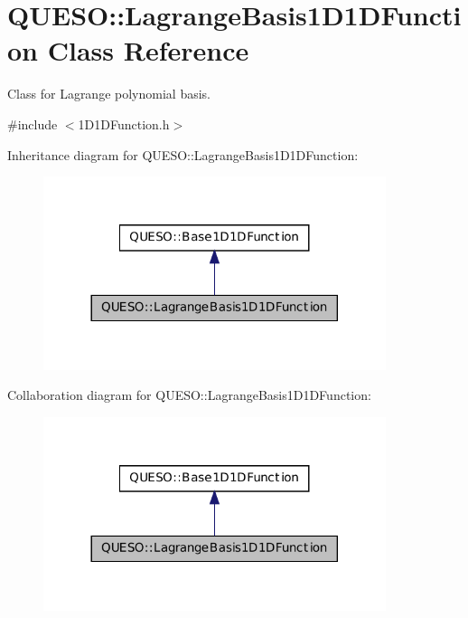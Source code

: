 \hypertarget{class_q_u_e_s_o_1_1_lagrange_basis1_d1_d_function}{\section{Q\-U\-E\-S\-O\-:\-:Lagrange\-Basis1\-D1\-D\-Function Class Reference}
\label{class_q_u_e_s_o_1_1_lagrange_basis1_d1_d_function}
}


Class for Lagrange polynomial basis.  




{\ttfamily \#include $<$1\-D1\-D\-Function.\-h$>$}



Inheritance diagram for Q\-U\-E\-S\-O\-:\-:Lagrange\-Basis1\-D1\-D\-Function\-:
\nopagebreak
\begin{figure}[H]
\begin{center}
\leavevmode
\includegraphics[width=284pt]{class_q_u_e_s_o_1_1_lagrange_basis1_d1_d_function__inherit__graph}
\end{center}
\end{figure}


Collaboration diagram for Q\-U\-E\-S\-O\-:\-:Lagrange\-Basis1\-D1\-D\-Function\-:
\nopagebreak
\begin{figure}[H]
\begin{center}
\leavevmode
\includegraphics[width=284pt]{class_q_u_e_s_o_1_1_lagrange_basis1_d1_d_function__coll__graph}
\end{center}
\end{figure}
